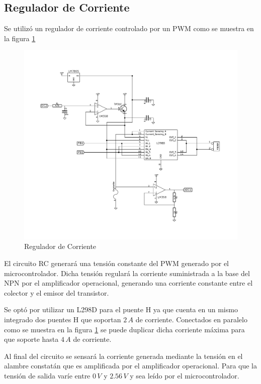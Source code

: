 \documentclass[10pt,spanish,a4paper,openany,notitlepage]{article}
\begin{document}
\subsection{Regulador de Corriente}

Se utilizó un regulador de corriente controlado por un PWM como se muestra
en la figura \ref{fig:reg_corriente}

\begin{figure}[H] %
\begin{center}
\includegraphics[scale=0.75]{../circuitos/regulador_corriente.pdf}
\caption{Regulador de Corriente}
 \label{fig:reg_corriente}
\end{center}
\end{figure}

El circuito RC generará una tensión constante del PWM generado por el
microcontrolador. Dicha tensión regulará la corriente suministrada a la
base del NPN por el amplificador operacional, generando una corriente
constante entre el colector y el emisor del transistor.

Se optó por utilizar un L298D para el puente H ya que cuenta en un mismo
integrado dos puentes H que soportan $2\, \unit{A}$ de corriente. 
Conectados en paralelo como se muestra en la figura \ref{fig:reg_corriente} 
se puede duplicar dicha corriente máxima para que soporte hasta $4\, \unit{A}$ de corriente.

Al final del circuito se sensará la corriente generada mediante la tensión
en el alambre constatán que es amplificada por el amplificador operacional.
Para que la tensión de salida varíe entre $0\, \unit{V}$ y $2.56\, \unit{V}$
y sea leído por el microcontrolador.
\end{document}
